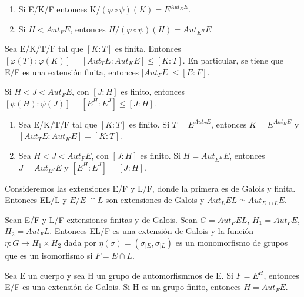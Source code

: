 \begin{lema}
\begin{enumerate}
    \item Si E/K/F entonces K/$(\varphi \circ \psi)(K)=E^{Aut_{K}E}$.
    \item Si $H < Aut_{F}E$, entonces $H/(\varphi \circ \psi)(H)=Aut_{E^{H}}E$
\end{enumerate}
\end{lema}
\begin{lema}
Sea E/K/T/F tal que $[K:T]$ es finita. Entonces $[\varphi(T):\varphi(K)]=[Aut_{T}E:Aut_{K}E]\leq [K:T]$. En particular, se tiene que E/F es una extensión finita, entonces $|Aut_{F}E|\leq [E:F]$.
\end{lema}
\begin{lema}
Si $H < J < Aut_{F}E$, con $[J:H]$ es finito, entonces $[\psi(H):\psi(J)]=[E^{H}:E^{J}]\leq [J:H]$.
\end{lema}
\begin{lema}
\begin{enumerate}
    \item Sea E/K/T/F tal que $[K:T]$ es finito. Si $T=E^{Aut_{T}E}$, entonces $K=E^{Aut_{K}E}$ y $[Aut_{T}E:Aut_{K}E]=[K:T]$.
    \item Sea $H < J < Aut_{F}E$, con $[J:H]$ es finito. Si $H=Aut_{E^{H}}E$, entonces $J=Aut_{E^{J}}E$ y $[E^{H}:E^{J}]=[J:H]$.
\end{enumerate}
\end{lema}
\begin{prop}
Consideremos las extensiones E/F y L/F, donde la primera es de Galois y finita. Entonces EL/L y $E/E\;\cap L$ son extensiones de Galois y $Aut_{L}EL \simeq Aut_{E\;\cap L}E$.
\end{prop}
\begin{prop}
Sean E/F y L/F extensiones finitas y de Galois. Sean $G=Aut_{F}EL$, $H_{1}=Aut_{F}E$, $H_{2}=Aut_{F}L$. Entonces EL/F es una extensión de Galois y la función $\eta : G \rightarrow H_{1}\times H_{2}$ dada por $\eta(\sigma)=(\sigma_{|E},\sigma_{|L})$ es un monomorfismo de grupos que es un isomorfismo si $F=E\cap L$.
\end{prop}
\begin{prop}
Sea E un cuerpo y sea H un grupo de automorfismmos de E. Si $F=E^{H}$, entonces E/F es una extensión de Galois. Si H es un grupo finito, entonces $H=Aut_{F}E$.
\end{prop}